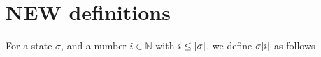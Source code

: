 {{%
% 


\section{NEW definitions}

 
\begin{definition}
\label{def:restrict}
For a state $\sigma$, and a number $i\in \mathbb{N}$ with $i \leq |\sigma|$, we define $\sigma[i]$ as follows


\end{definition}}}
